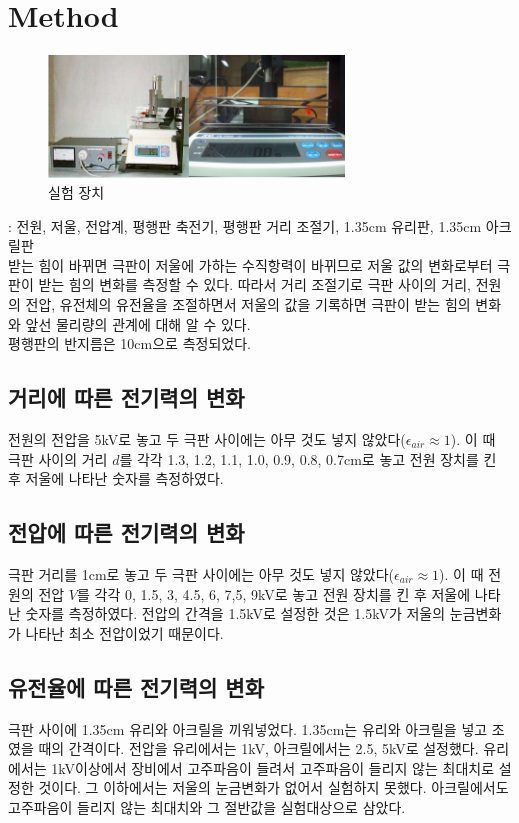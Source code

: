 \documentclass[a4paper, 8pt]{article}
\begin{document}
\section{Method}
	\begin{figure}[h]
		\centering
		\includegraphics[width=0.7\textwidth]{img/expconfig.png}
		\caption{실험 장치}
	\end{figure}
	: 전원, 저울, 전압계, 평행판 축전기, 평행판 거리 조절기, 1.35cm 유리판, 1.35cm 아크릴판\\
	 받는 힘이 바뀌면 극판이 저울에 가하는 수직항력이 바뀌므로 저울 값의 변화로부터 극판이 받는 힘의 변화를 측정할 수 있다. 따라서 거리 조절기로 극판 사이의 거리, 전원의 전압, 유전체의 유전율을 조절하면서 저울의 값을 기록하면 극판이 받는 힘의 변화와 앞선 물리량의 관계에 대해 알 수 있다.\\
	평행판의 반지름은 10\si{cm}으로 측정되었다.

\subsection{거리에 따른 전기력의 변화}
	전원의 전압을 5\si{kV}로 놓고 두 극판 사이에는 아무 것도 넣지 않았다($\epsilon{}_{air} \approx 1$).
	이 때 극판 사이의 거리 $d$를 각각 1.3, 1.2, 1.1, 1.0, 0.9, 0.8, 0.7\si{cm}로 놓고 전원 장치를 킨 후 저울에 나타난 숫자를 측정하였다.

\subsection{전압에 따른 전기력의 변화}
	극판 거리를 1\si{cm}로 놓고 두 극판 사이에는 아무 것도 넣지 않았다($\epsilon{}_{air} \approx 1$).
	이 때 전원의 전압 $V$를 각각 0, 1.5, 3, 4.5, 6, 7,5, 9\si{kV}로 놓고 전원 장치를 킨 후 저울에 나타난 숫자를 측정하였다. 
	전압의 간격을 1.5\si{kV}로 설정한 것은 1.5\si{kV}가 저울의 눈금변화가 나타난 최소 전압이었기 때문이다.

\subsection{유전율에 따른 전기력의 변화}
	극판 사이에 1.35\si{cm} 유리와 아크릴을 끼워넣었다. 1.35\si{cm}는 유리와 아크릴을 넣고 조였을 때의 간격이다.
	전압을 유리에서는 1\si{kV}, 아크릴에서는 2.5, 5\si{kV}로 설정했다. 
	유리에서는 1\si{kV}이상에서 장비에서 고주파음이 들려서 고주파음이 들리지 않는 최대치로 설정한 것이다. 
	그 이하에서는 저울의 눈금변화가 없어서 실험하지 못했다. 
	아크릴에서도 고주파음이 들리지 않는 최대치와 그 절반값을 실험대상으로 삼았다.  
\end{document}

